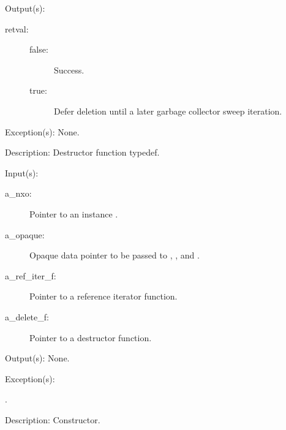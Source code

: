 \begin{capi}
\begin{capilist}
\begin{description}
		\end{description}
	\item[Output(s): ]
		\begin{description}\item[]
		\item[retval: ]
			\begin{description}\item[]
			\item[false: ] Success.
			\item[true: ] Defer deletion until a later garbage
			collector sweep iteration.
			\end{description}
		\end{description}
	\item[Exception(s): ] None.
	\item[Description: ]
		Destructor function typedef.
	\end{capilist}
\label{nxo_instance_new}
	\begin{capilist}
	\item[Input(s): ]
		\begin{description}\item[]
		\item[a\_nxo: ]
			Pointer to an instance .
		\item[a\_opaque: ]
			Opaque data pointer to be passed to ,
			, and .
		\item[a\_ref\_iter\_f: ]
			Pointer to a reference iterator function.
		\item[a\_delete\_f: ]
			Pointer to a destructor function.
		\end{description}
	\item[Output(s): ] None.
	\item[Exception(s): ]
		\begin{description}\item[]
		\item[.]
		\end{description}
	\item[Description: ]
		Constructor.
	\end{capilist}
\label{nxo_instance_isa_get}

\end{capi}
